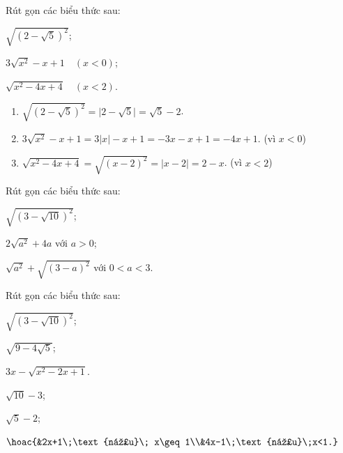 \begin{bt}
	Rút gọn các biểu thức sau:
	\begin{listEX}[3]
	\item $\sqrt{\left(2-\sqrt{5}\right)^2}$;
	\item $3 \sqrt{x^2}-x+1 \quad(x<0)$;
	\item $\sqrt{x^2-4 x+4} \quad(x<2)$.
	\end{listEX}
	\loigiai
	{
	\begin{enumerate}
	\item $\sqrt{\left(2-\sqrt{5}\right)^2}=\big|2-\sqrt{5}\big|=\sqrt{5}-2$.
	\item $3 \sqrt{x^2}-x+1=3\big|x\big|-x+1=-3x-x+1=-4x+1$. (vì $x<0$)
	\item $\sqrt{x^2-4 x+4}=\sqrt{\left(x-2\right)^2}=\big|x-2\big|=2-x$. (vì $x<2$)
	\end{enumerate}	
	}
\end{bt}
\begin{bt} 
	Rút gọn các biểu thức sau:
	\begin{enumEX}{3}
	\item $\sqrt{(3-\sqrt{10})^{2}}$;
	\item $2 \sqrt{a^{2}}+4 a$ với $a>0$;
	\item $\sqrt{a^{2}}+\sqrt{(3-a)^{2}}$ với $0<a<3$.
	\end{enumEX}
\end{bt}
\begin{bt}%
	Rút gọn các biểu thức sau:
	\begin{listEX}[3]
	\item $\sqrt{\left(3-\sqrt{10}\right)^2}$;
	\item $\sqrt{9-4\sqrt{5}}$;
	\item $3x-\sqrt{x^2-2x+1}$.
	\end{listEX}
	\loigiai
	{
	\begin{listEX}[3]
	\item $\sqrt{10}-3$;
	\item $\sqrt{5}-2$;
	\item $\hoac{&2x+1\;\text{nếu}\; x\geq 1\\&4x-1\;\text{nếu}\;x<1.}$
	\end{listEX}	}
\end{bt}
